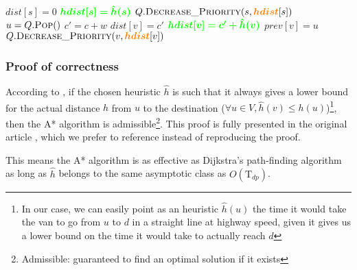 \documentclass{report}[a4paper]
\theoremstyle{remark}
\begin{document}
\begin{center}
\begin{algorithm}[H]
\begin{minipage}[t]{0.49\linewidth}
\begin{algorithmic}[1]
                    \EndFor
                    \State $dist[s] = 0$
                    \State $\textcolor{green}{\bm{hdist[s] = \hat{h}(s)}}$
                    \State $Q.\textsc{Decrease\_Priority}(s, \textcolor{orange}{\bm{hdist}}[s])$
                        \State $u = Q.\textsc{Pop}()$
                            \State $c' = c + w$
                                \State $dist[v] = c'$
                                \State $\textcolor{green}{\bm{hdist[v] = c'+\hat{h}(v)}}$
                                \State $prev[v] = u$
                                \State $Q.\textsc{Decrease\_Priority}(v, \textcolor{orange}{\bm{hdist}}[v])$
                            \EndIf
                        \EndFor
                    \EndWhile
                \EndProcedure
            \end{algorithmic}
        \end{minipage}
    \end{algorithm}
\end{center}
\subsubsection{Proof of correctness}
According to \cite{encyc-AI-Astar}, if the chosen heuristic $\hat{h}$ is such that it always gives a lower bound for the actual distance $h$ from $u$ to the destination ($\forall u \in V, \hat{h}(v) \leq h(u)$)\footnote{In our case, we can easily point as an heuristic $\hat{h}(u)$ the time it would take the van to go from $u$ to $d$ in a straight line at highway speed, given it gives us a lower bound on the time it would take to actually reach $d$}, then the A* algorithm is admissible\footnote{Admissible: guaranteed to find an optimal solution if it exists}. This proof is fully presented in the original article \cite{Astar}, which we prefer to reference instead of reproducing the proof.\par
This means the A* algorithm is as effective as Dijkstra's path-finding algorithm as long as $\hat{h}$ belongs to the same asymptotic class as $O(\text{T}_{dp})$.
\end{document}
